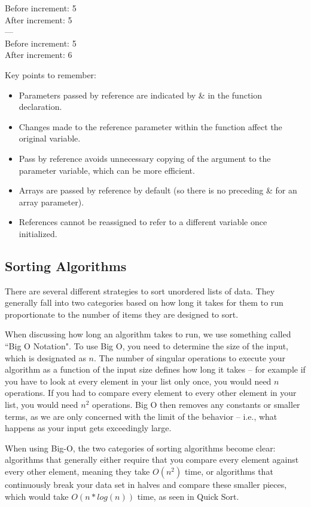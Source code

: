 \begin{sample}
Before increment: 5 \\
After increment: 5\\
---\\
Before increment: 5\\
After increment: 6\\
\end{sample}

Key points to remember:

\begin{itemize}
    \item Parameters passed by reference are indicated by \& in the function declaration.
    \item Changes made to the reference parameter within the function affect the original variable.
    \item Pass by reference avoids unnecessary copying of the argument to the parameter variable, which can be more efficient.
    \item Arrays are passed by reference by default (so there is no preceding \& for an array parameter).
    \item References cannot be reassigned to refer to a different variable once initialized.
\end{itemize}
    
\subsection{Sorting Algorithms}

There are several different strategies to sort unordered lists of data. They generally fall into two categories based on how long it takes for them to run proportionate to the number of items they are designed to sort. 

When discussing how long an algorithm takes to run, we use something called ``Big O Notation". To use Big O, you need to determine the size of the input, which is designated as $n$. The number of singular operations to execute your algorithm as a function of the input size defines how long it takes -- for example if you have to look at every element in your list only once, you would need $n$ operations. If you had to compare every element to every other element in your list, you would need $n^2$ operations. Big O then removes any constants or smaller terms, as we are only concerned with the limit of the behavior -- i.e., what happens as your input gets exceedingly large. 

When using Big-O, the two categories of sorting algorithms become clear: algorithms that generally either require that you compare every element against every other element, meaning they take $O(n^2)$ time, or algorithms that continuously break your data set in halves and compare these smaller pieces, which would take $O(n*log(n))$ time, as seen in Quick Sort.

